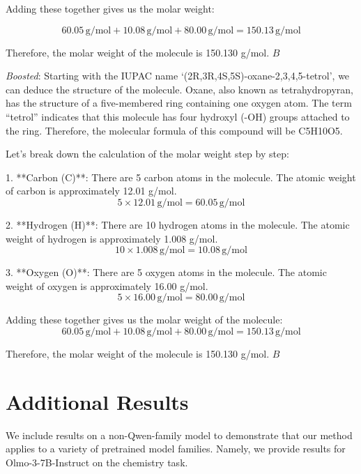 \documentclass{article}
\begin{document}
\begin{center}
\begin{tcolorbox}
{Adding these together gives us the molar weight:

\[ 
60.05 \, \text{g/mol} + 10.08 \, \text{g/mol} + 80.00 \, \text{g/mol} = 150.13 \, \text{g/mol}
\]

Therefore, the molar weight of the molecule is 150.130 g/mol. $\boxed{{B}}$


\vspace{1.8em}

\textit{Boosted}: Starting with the IUPAC name `(2R,3R,4S,5S)-oxane-2,3,4,5-tetrol', we can deduce the structure of the molecule. Oxane, also known as tetrahydropyran, has the structure of a five-membered ring containing one oxygen atom. The term ``tetrol'' indicates that this molecule has four hydroxyl (-OH) groups attached to the ring. Therefore, the molecular formula of this compound will be C5H10O5.

Let's break down the calculation of the molar weight step by step:

1. **Carbon (C)**: There are 5 carbon atoms in the molecule. The atomic weight of carbon is approximately 12.01 g/mol.
   \[ 5 \times 12.01 \, \text{g/mol} = 60.05 \, \text{g/mol} \]

2. **Hydrogen (H)**: There are 10 hydrogen atoms in the molecule. The atomic weight of hydrogen is approximately 1.008 g/mol.
   \[10 \times 1.008 \, \text{g/mol} = 10.08 \, \text{g/mol}\]

3. **Oxygen (O)**: There are 5 oxygen atoms in the molecule. The atomic weight of oxygen is approximately 16.00 g/mol.
   \[5 \times 16.00 \, \text{g/mol} = 80.00 \, \text{g/mol}\]

Adding these together gives us the molar weight of the molecule:
\[60.05 \, \text{g/mol} + 10.08 \, \text{g/mol} + 80.00 \, \text{g/mol} = 150.13 \, \text{g/mol}\]

Therefore, the molar weight of the molecule is 150.130 g/mol. $\boxed{{B}}$
}
\end{tcolorbox}
\end{center}





\section{Additional Results}\label{apx:olmo}
We include results on a non-Qwen-family model to demonstrate that our method applies to a variety of pretrained model families. Namely, we provide results for Olmo-3-7B-Instruct on the chemistry task.
\end{document}

